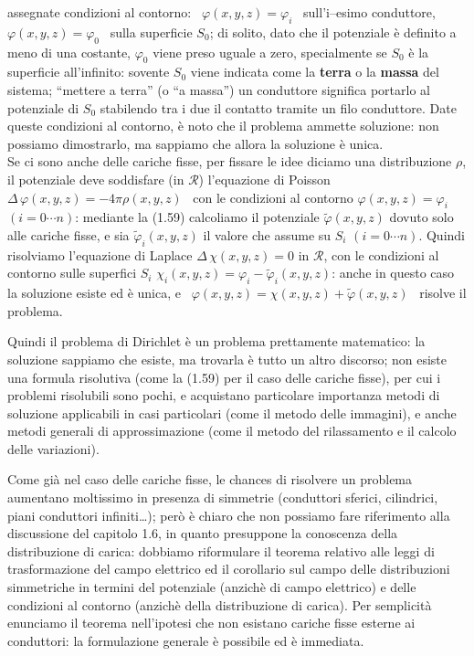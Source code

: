 assegnate condizioni al contorno: \ $\varphi(x,y,z)=\varphi_i$ \ sull'i--esimo
conduttore, \ $\varphi(x,y,z)=\varphi_0$ \ sulla superficie $S_0$; di solito,
dato che il potenziale \`e definito a meno di una costante, $\varphi_0$ viene
preso uguale a zero, specialmente se $S_0$ \`e la superficie all'infinito:
sovente $S_0$ viene indicata come la \textbf{terra} o la \textbf{massa} del
sistema; ``mettere a terra'' (o ``a massa'') un conduttore significa portarlo al
potenziale di $S_0$ stabilendo tra i due il contatto tramite un filo conduttore.
Date queste condizioni al contorno, \`e noto che il problema ammette soluzione:
non possiamo dimostrarlo, ma sappiamo che allora la soluzione \`e unica.\\
Se ci sono anche delle cariche fisse, per fissare le idee diciamo una
distribuzione $\rho$, il potenziale deve soddisfare (in $\mathcal R$)
l'equazione di Poisson \ $\Delta\,\varphi(x,y,z)=-4\pi\rho(x,y,z)$ \ con le
condizioni al contorno $\varphi(x,y,z)=\varphi_i$ \quad $(i=0\cdots n)$:
mediante la (1.59) calcoliamo il potenziale $\tilde\varphi(x,y,z)$ dovuto solo
alle cariche fisse, e sia $\tilde\varphi_i(x,y,z)$ il valore che assume su $S_i$
\quad $(i=0\cdots n)$. Quindi risolviamo l'equazione di Laplace
$\Delta\,\chi(x,y,z)=0$ in $\mathcal R$, con le condizioni al contorno sulle
superfici $S_i$ \quad $\chi_i(x,y,z)=\varphi_i-\tilde\varphi_i(x,y,z)$: anche in
questo caso la soluzione esiste ed \`e unica, e
\ $\varphi(x,y,z)=\chi(x,y,z)+\tilde\varphi(x,y,z)$ \ risolve il problema.

Quindi il problema di Dirichlet \`e un problema prettamente matematico: la
soluzione
sappiamo che esiste, ma trovarla \`e tutto un altro discorso; non esiste una
formula risolutiva (come la (1.59) per il caso delle cariche fisse), per cui i
problemi risolubili sono pochi, e acquistano particolare importanza metodi di
soluzione applicabili in casi particolari (come il metodo delle immagini), e
anche metodi generali di approssimazione (come il metodo del rilassamento e il
calcolo delle variazioni).

Come gi\`a nel caso delle cariche fisse, le chances di risolvere un problema
aumentano moltissimo in presenza di simmetrie (conduttori sferici, cilindrici,
piani conduttori infiniti\dots); per\`o \`e chiaro che non possiamo fare
riferimento alla discussione del capitolo 1.6, in quanto presuppone la
conoscenza della distribuzione di carica: dobbiamo riformulare il teorema
relativo alle leggi di trasformazione del campo elettrico ed il corollario sul
campo delle distribuzioni simmetriche in termini del potenziale (anzich\`e di
campo elettrico) e delle condizioni al contorno (anzich\`e della distribuzione
di carica). Per semplicit\`a enunciamo il teorema nell'ipotesi che non esistano
cariche fisse esterne ai conduttori: la formulazione generale \`e possibile ed
\`e immediata.

